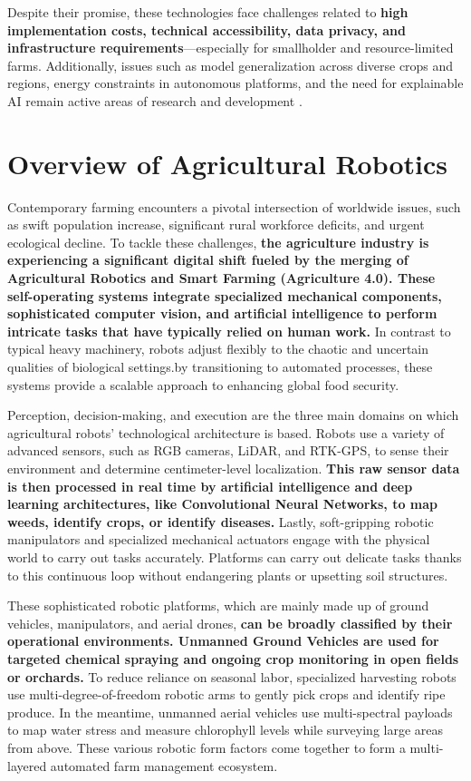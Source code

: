 Despite their promise, these technologies face challenges related to \textbf{high implementation costs, technical accessibility, data privacy, and infrastructure requirements}—especially for smallholder and resource-limited farms. Additionally, issues such as model generalization across diverse crops and regions, energy constraints in autonomous platforms, and the need for explainable AI remain active areas of research and development \citep{AIReview2025, MDPI2025}.

\section{Overview of Agricultural Robotics}

Contemporary farming encounters a pivotal intersection of worldwide issues, such as swift population increase, significant rural workforce deficits, and urgent ecological decline. To tackle these challenges,\textbf{ the agriculture industry is experiencing a significant digital shift fueled by the merging of Agricultural Robotics and Smart Farming (Agriculture 4.0). These self-operating systems integrate specialized mechanical components, sophisticated computer vision, and artificial intelligence to perform intricate tasks that have typically relied on human work.} In contrast to typical heavy machinery, robots adjust flexibly to the chaotic and uncertain qualities of biological settings.by transitioning to automated processes, these systems provide a scalable approach to enhancing global food security.\citep{1}

Perception, decision-making, and execution are the three main domains on which agricultural robots' technological architecture is based. Robots use a variety of advanced sensors, such as RGB cameras, LiDAR, and RTK-GPS, to sense their environment and determine centimeter-level localization. \textbf{This raw sensor data is then processed in real time by artificial intelligence and deep learning architectures, like Convolutional Neural Networks, to map weeds, identify crops, or identify diseases.} Lastly, soft-gripping robotic manipulators and specialized mechanical actuators engage with the physical world to carry out tasks accurately. Platforms can carry out delicate tasks thanks to this continuous loop without endangering plants or upsetting soil structures.\cite{3}

These sophisticated robotic platforms, which are mainly made up of ground vehicles, manipulators, and aerial drones, \textbf {can be broadly classified by their operational environments. Unmanned Ground Vehicles are used for targeted chemical spraying and ongoing crop monitoring in open fields or orchards.} To reduce reliance on seasonal labor, specialized harvesting robots use multi-degree-of-freedom robotic arms to gently pick crops and identify ripe produce. In the meantime, unmanned aerial vehicles use multi-spectral payloads to map water stress and measure chlorophyll levels while surveying large areas from above. These various robotic form factors come together to form a multi-layered automated farm management ecosystem.

